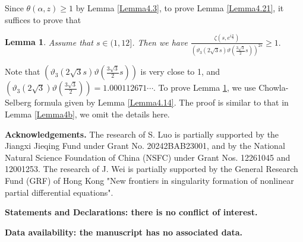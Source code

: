 \documentclass[reqno,english]{amsart}
\newtheorem{lemma}{Lemma}[section]
\newtheorem{open problem}{Open Problem}[section]
\newtheorem{open question}{Open Question}[section]
\newtheorem{open questions on hexagonal lattice}{Open Questions on hexagonal lattice}[section]
\begin{document}
Since $\theta(\alpha,z)\geq1$ by Lemma \ref{Lemma4.3}, to prove Lemma \ref{Lemma4.21}, it suffices to prove that

\begin{lemma}\label{Lemma4.22}
Assume that $s\in(1,12]$. Then we have
$
\frac{\zeta(s,e^{i\frac{\pi}{3}})}{(\vartheta_3(2\sqrt3 s)\vartheta(\frac{3\sqrt3}{2} s))^{2s}}\geq1.
$

\end{lemma}
Note that $(\vartheta_3(2\sqrt3 s)\vartheta(\frac{3\sqrt3}{2} s))$ is very close to 1,
and $(\vartheta_3(2\sqrt3 )\vartheta(\frac{3\sqrt3}{2} ))=1.000112671\cdots$.
To prove Lemma \ref{Lemma4.22}, we use Chowla-Selberg formula given by Lemma \ref{Lemma4.14}.
The proof is similar to that in Lemma \ref{Lemma4b}, we omit the details here.





\bigskip
\noindent
{\bf Acknowledgements.} The research of S. Luo is partially supported by the Jiangxi Jieqing Fund under Grant No. 20242BAB23001, and by the National Natural Science Foundation of China (NSFC) under Grant Nos. 12261045 and 12001253. The research of J. Wei is partially supported by the General Research Fund (GRF) of Hong Kong "New frontiers in singularity formation of nonlinear partial differential equations".

{\bf Statements and Declarations: there is no conflict of interest.}

{\bf Data availability: the manuscript has no associated data.}
\bigskip
\end{document}
